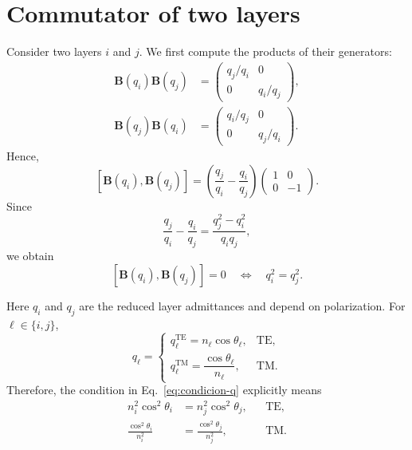 \documentclass[10pt,a4paper]{article}
\newcommand{\B}{\mathbf{B}}
\newcommand{\comm}[2]{\left[#1,#2\right]}
\begin{document}
\section{Commutator of two layers}

Consider two layers $i$ and $j$. We first compute the products of their generators:
\begin{align}
\B(q_i)\B(q_j)
&=
\begin{pmatrix}
q_j/q_i&0\\
0&q_i/q_j
\end{pmatrix},\\[3pt]
\B(q_j)\B(q_i)
&=
\begin{pmatrix}
q_i/q_j&0\\
0&q_j/q_i
\end{pmatrix}.
\end{align}
Hence,
\begin{equation}
\comm{\B(q_i)}{\B(q_j)}
=
\left(\frac{q_j}{q_i}-\frac{q_i}{q_j}\right)
\begin{pmatrix}1&0\\0&-1\end{pmatrix}.
\label{eq:conmutador-B}
\end{equation}
Since
\begin{equation}
\frac{q_j}{q_i}-\frac{q_i}{q_j}
=\frac{q_j^2-q_i^2}{q_iq_j},
\end{equation}
we obtain
\begin{equation}
\comm{\B(q_i)}{\B(q_j)}=0
\quad\Longleftrightarrow\quad
q_i^2=q_j^2.
\label{eq:condicion-q}
\end{equation}

Here $q_i$ and $q_j$ are the reduced layer admittances and depend on polarization. For $\ell\in\{i,j\}$,
\begin{equation*}
q_\ell=
\begin{cases}
q_\ell^{\mathrm{TE}}=n_\ell\cos\theta_\ell,
&\mathrm{TE},\\[2pt]
q_\ell^{\mathrm{TM}}=\dfrac{\cos\theta_\ell}{n_\ell},
&\mathrm{TM}.
\end{cases}
\end{equation*}
Therefore, the condition in Eq.~\eqref{eq:condicion-q} explicitly means
\begin{equation*}
\begin{aligned}
n_i^2\cos^2\theta_i&=n_j^2\cos^2\theta_j,
&&\mathrm{TE},\\
\frac{\cos^2\theta_i}{n_i^2}
&=\frac{\cos^2\theta_j}{n_j^2},
&&\mathrm{TM}.
\end{aligned}
\end{equation*}
\end{document}

